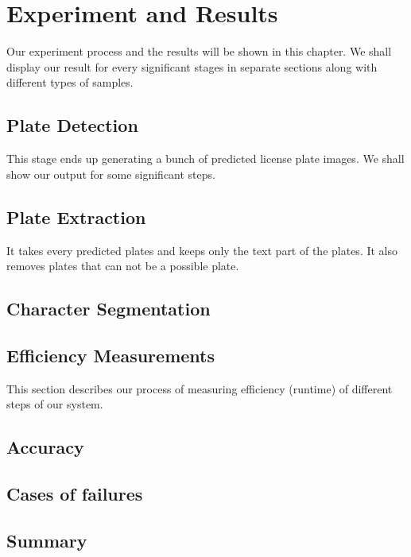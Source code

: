 \chapter{Experiment and Results}
Our experiment process and the results will be shown in this chapter. We shall display our result for every significant stages in separate sections along with different types of samples.


\section{Plate Detection}
This stage ends up generating a bunch of predicted license plate images. We shall show our output for some significant steps.
  
  
  
  
  


\section{Plate Extraction}
It takes every predicted plates and keeps only the text part of the plates. It also removes plates that can not be a possible plate.
  
  
  
  


\section{Character Segmentation}  


\section{Efficiency Measurements}
This section describes our process of measuring efficiency (runtime) of different steps of our system.
  
  
  

\section{Accuracy}


%

\section{Cases of failures}


\section{Summary}


